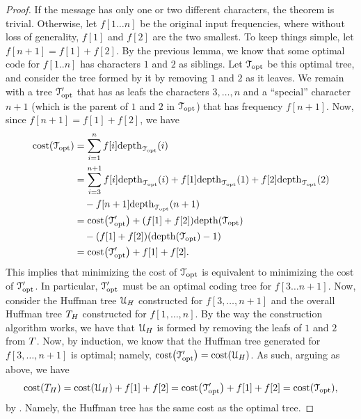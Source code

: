 \begin{proof}
    If the message has only one or two different characters, the
    theorem is trivial.  Otherwise, let $f[1 \ldots n]$ be the
    original input frequencies, where without loss of generality,
    $f[1]$ and $f[2]$ are the two smallest. To keep things simple, let
    $f[n + 1] = f[1] + f[2]$. By the previous lemma, we know that some
    optimal code for $f[1 .. n]$ has characters $1$ and $2$ as
    siblings. Let $\EuScript{T}_\mathrm{opt}$ be this optimal tree, and consider the
    tree formed by it by removing $1$ and $2$ as it leaves. We remain
    with a tree $\EuScript{T}_\mathrm{opt}'$ that has as leafs the characters
    $3,\ldots, n$ and a ``special'' character $n+1$ (which is the
    parent of $1$ and $2$ in $\EuScript{T}_\mathrm{opt}$) that has frequency
    $f[n+1]$. Now, since $f[n+1] = f[1] + f[2]$, we have
    \begin{align}
        \costX{\TreeOpt} &= \sum_{i=1}^n f[i] \DepthExt{\TreeOpt}{i} \nonumber\\
        &= \sum_{i=3}^{n+1} f[i] \DepthExt{\TreeOpt}{i} + f[1]
        \DepthExt{\TreeOpt}{1} + f[2] \DepthExt{\TreeOpt}{2} \nonumber\\
        &\quad - f[n+1]
        \DepthExt{\TreeOpt}{n+1} \nonumber\\
        &= \costX{\TreeOptA} + \pth{\MakeSBig f[1] + f[2] }
        \depthX{\TreeOpt} \nonumber\\
        &\quad - \pth{\MakeSBig f[1] + f[2]
        } \pth{\depthX{\TreeOpt}-1} \nonumber\\
        &= \costX{\TreeOptA} + f[1] + f[2]. %
        \eqlab{huffman:price}
    \end{align}
    This implies that minimizing the cost of $\EuScript{T}_\mathrm{opt}$ is equivalent
    to minimizing the cost of $\EuScript{T}_\mathrm{opt}'$. In particular, $\EuScript{T}_\mathrm{opt}'$
    must be an optimal coding tree for $f[3\ldots n+1]$. Now, consider
    the Huffman tree $\EuScript{U}_H$ constructed for $f[3, \ldots, n+1]$
    and the overall Huffman tree $T_H$ constructed for
    $f[1, \ldots, n]$. By the way the construction algorithm works, we
    have that $\EuScript{U}_H$ is formed by removing the leafs of $1$ and
    $2$ from $T$.  Now, by induction, we know that the Huffman
    tree generated for $f[3, \ldots, n+1]$ is optimal; namely,
    $\costX{\TreeOptA} = \costX{\TreeA_H}$.  As such, arguing as
    above, we have
    \begin{equation*}
    \costX{\Tree_H} = \costX{\TreeA_H} + f[1] + f[2] =
    \costX{\TreeOptA} + f[1] + f[2] = \costX{\TreeOpt},
    \end{equation*}
    by .  Namely, the Huffman tree has the same
    cost as the optimal tree.
\end{proof}


